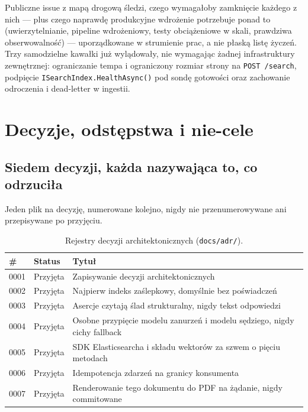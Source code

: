 \documentclass[11pt,a4paper]{article}
\begin{document}
Publiczne issue z mapą drogową śledzi, czego wymagałoby zamknięcie każdego z
nich --- plus czego naprawdę produkcyjne wdrożenie potrzebuje ponad to
(uwierzytelnianie, pipeline wdrożeniowy, testy obciążeniowe w skali, prawdziwa
obserwowalność) --- uporządkowane w strumienie prac, a nie płaską listę
życzeń. Trzy samodzielne kawałki już wylądowały, nie wymagając żadnej
infrastruktury zewnętrznej: ograniczanie tempa i ograniczony rozmiar strony na
\texttt{POST /search}, podpięcie \texttt{ISearchIndex.\-HealthAsync()} pod
sondę gotowości oraz zachowanie odroczenia i dead-letter w ingestii.

\section{Decyzje, odstępstwa i nie-cele}

\subsection{Siedem decyzji, każda nazywająca to, co odrzuciła}

Jeden plik na decyzję, numerowane kolejno, nigdy nie przenumerowywane ani
przepisywane po przyjęciu.

\begin{table}[htbp]
\centering
\caption{Rejestry decyzji architektonicznych (\texttt{docs/adr/}).}
\begin{tabularx}{\linewidth}{@{}llX@{}}
\toprule
\textbf{\#} & \textbf{Status} & \textbf{Tytuł} \\
\midrule
0001 & Przyjęta & Zapisywanie decyzji architektonicznych \\
0002 & Przyjęta & Najpierw indeks zaślepkowy, domyślnie bez poświadczeń \\
0003 & Przyjęta & Asercje czytają ślad strukturalny, nigdy tekst odpowiedzi \\
0004 & Przyjęta & Osobne przypięcie modelu zanurzeń i modelu sędziego, nigdy cichy fallback \\
0005 & Przyjęta & SDK Elasticsearcha i składu wektorów za szwem o pięciu metodach \\
0006 & Przyjęta & Idempotencja zdarzeń na granicy konsumenta \\
0007 & Przyjęta & Renderowanie tego dokumentu do PDF na żądanie, nigdy commitowane \\
\bottomrule
\end{tabularx}
\end{table}
\end{document}
